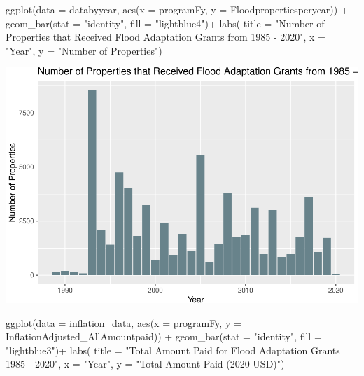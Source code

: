 \documentclass[
  12pt,
]{article}
\newenvironment{Shaded}{\begin{snugshade}}{\end{snugshade}}
\newcommand{\AttributeTok}[1]{\textcolor[rgb]{0.77,0.63,0.00}{#1}}
\newcommand{\FunctionTok}[1]{\textcolor[rgb]{0.00,0.00,0.00}{#1}}
\newcommand{\NormalTok}[1]{#1}
\newcommand{\SpecialCharTok}[1]{\textcolor[rgb]{0.00,0.00,0.00}{#1}}
\newcommand{\StringTok}[1]{\textcolor[rgb]{0.31,0.60,0.02}{#1}}
\begin{document}
\begin{Shaded}
\begin{Highlighting}[]
\FunctionTok{ggplot}\NormalTok{(}\AttributeTok{data =}\NormalTok{ databyyear, }\FunctionTok{aes}\NormalTok{(}\AttributeTok{x =}\NormalTok{ programFy, }\AttributeTok{y =}\NormalTok{ Floodpropertiesperyear)) }\SpecialCharTok{+}
  \FunctionTok{geom\_bar}\NormalTok{(}\AttributeTok{stat =} \StringTok{"identity"}\NormalTok{, }\AttributeTok{fill =} \StringTok{"lightblue4"}\NormalTok{)}\SpecialCharTok{+}
  \FunctionTok{labs}\NormalTok{( }
    \AttributeTok{title =} \StringTok{"Number of Properties that Received Flood Adaptation Grants from 1985 {-} 2020"}\NormalTok{, }
    \AttributeTok{x =} \StringTok{"Year"}\NormalTok{, }
    \AttributeTok{y =} \StringTok{"Number of Properties"}\NormalTok{)}
\end{Highlighting}
\end{Shaded}

\includegraphics{finalreport_files/figure-latex/unnamed-chunk-3-1.pdf}

\begin{Shaded}
\begin{Highlighting}[]
\FunctionTok{ggplot}\NormalTok{(}\AttributeTok{data =}\NormalTok{ inflation\_data, }\FunctionTok{aes}\NormalTok{(}\AttributeTok{x =}\NormalTok{ programFy, }\AttributeTok{y =}\NormalTok{ InflationAdjusted\_AllAmountpaid)) }\SpecialCharTok{+}
  \FunctionTok{geom\_bar}\NormalTok{(}\AttributeTok{stat =} \StringTok{"identity"}\NormalTok{, }\AttributeTok{fill =} \StringTok{"lightblue3"}\NormalTok{)}\SpecialCharTok{+}
  \FunctionTok{labs}\NormalTok{( }
    \AttributeTok{title =} \StringTok{"Total Amount Paid for Flood Adaptation Grants 1985 {-} 2020"}\NormalTok{, }
    \AttributeTok{x =} \StringTok{"Year"}\NormalTok{, }
    \AttributeTok{y =} \StringTok{"Total Amount Paid (2020 USD)"}\NormalTok{)}
\end{Highlighting}
\end{Shaded}
\end{document}
